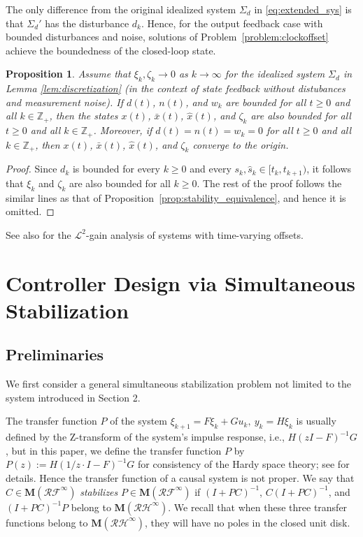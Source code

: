 \documentclass[letterpaper, 12pt, draftcls, onecolumn]{ieeeconf}
\newtheorem{proposition}[theorem]{Proposition}
\begin{document}
The only difference from
the original idealized system $\Sigma_d$ in \eqref{eq:extended_sys} is
that $\Sigma_d'$ has the disturbance $d_k$. 
Hence, 
for the output feedback case with
bounded disturbances and noise,
solutions of Problem~\ref{problem:clockoffset} achieve
the boundedness of the closed-loop state.
\begin{proposition}
	Assume that $\xi_k, \zeta_{k} \to 0$ as $k \to \infty$
	for the idealized system $\Sigma_d$ in Lemma \ref{lem:discretization}
	(in the context of state feedback without distubances and measurement noise).
	If $d(t)$, $n(t)$, and $w_k$ are bounded for all $t \geq 0$ and 
	all $k \in \mathbb{Z}_+$,
then the states
	$x(t)$, $\bar x(t)$, $\hat x(t)$, and $\zeta_{k} $ are also bounded for all $t \geq 0$ and all
	$k \in \mathbb{Z}_+$.
	Moreover, if $d(t) = n(t) = w_k = 0$ for all $t \geq 0$ and 
	all $k \in \mathbb{Z}_+$, then
	$x(t)$, $\bar x(t)$, $\hat x(t)$, and $\zeta_{k} $ converge to the origin.
\end{proposition}
\begin{proof}
	Since $d_{k}$
	is bounded for every $k \geq 0$ and every $s_k,\hat s_k \in [t_k,t_{k+1})$, 
	it follows that $\xi_k$ and $\zeta_{k} $ are also bounded
	for all $k \geq 0$.
	The rest of the proof follows the similar lines as that of 
	Proposition~\ref{prop:stability_equivalence}, 
	and hence it is omitted.
\end{proof}






See also \cite{Wakaiki2016ACC} for the $\mathcal{L}^2$-gain analysis 
of systems with time-varying offsets.




\section{Controller Design via Simultaneous Stabilization}
\subsection{Preliminaries}
We first consider a general simultaneous stabilization problem 
not limited to the system introduced in Section 2.

The transfer function $P$ 
of the system $\xi_{k+1} = F\xi_k+Gu_k,~y_k = H\xi_k$
is usually defined by the Z-transform of the system's impulse response,
i.e.,
$H(zI-F)^{-1}G$,
but in this paper, we define the transfer function $P$ 
by $P(z) := H(1/z \cdot I-F)^{-1}G$ for 
consistency of the Hardy space theory;
see \cite[Sec. 2.2]{vidyasagar1985} for details.
Hence the transfer function of a causal system is not proper.
We say that $C \in \mathbf{M}(\mathcal{RF}^{\infty})$ 
{\it stabilizes} $P \in \mathbf{M}(\mathcal{RF}^{\infty})$
if $(I+PC)^{-1}$, $C(I+PC)^{-1}$, and $(I+PC)^{-1}P$ belong
to $\mathbf{M}(\mathcal{RH}^{\infty})$. 
We recall that when these three transfer functions belong to 
$\mathbf{M}(\mathcal{RH}^{\infty})$, 
they will have no poles in the closed unit disk.
\end{document}
